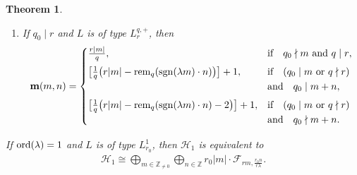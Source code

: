 \documentclass[pdftex]{sigma}
\newcommand\Z{{\mathbb Z}}
\newcommand\bm{\textbf{{\rm \textbf{m}}}}
\newcommand\cH{{\mathcal H}}
\newcommand{\sgn}{\mathop{{\rm sgn}}}
\newcommand{\rem}{\mathop{{\rm rem}}}
\newcommand{\ord}{{\rm ord}}
\numberwithin{equation}{section}
\newtheorem{Theorem}{Theorem}[section]
\begin{document}
\begin{Theorem}
\begin{enumerate}
\begin{enumerate}
\begin{gather*}
\begin{cases}
& \text{if\quad $n \equiv \overline{rm}$ {\rm mod}\ $q_0$},
\\[.5ex]
\big[\frac1q\big( r|m|-\rem_q(\sgn(\lambda m)\cdot n)-2\big)\big]+1,
& \text{if\quad $n\not\equiv \overline{rm}$ {\rm mod} $q_0$},
\end{cases}
\end{gather*}
where $\overline{rm}=\sgn(\lambda)rm$ if $3\mid q$ and $\overline{rm}=0$ otherwise.
%
\item[$(b)$]
 If $q_0\mid r$ and $L$ is of type $L_r^{q,+}$, then
\begin{gather*}
\bm(m,n) =
\begin{cases}
\frac{r|m|}{q},&\text{if\quad $q_0\nmid m$ and $q\mid r$},
\\[1ex]
\big[\frac1q\big(r|m|-\rem_q(\sgn(\lambda m)\cdot n)\big)\big]+1,
& \text{if\quad $(q_0\mid m$ or $q\nmid r)$}
\\
&\mbox{and}\quad q_0\mid m+n,
\\[1ex]
\big[\frac1q\big(r|m|-\rem_q(\sgn(\lambda m)\cdot n)-2\big)\big]+1,
&\text{if\quad $(q_0\mid m$ or $q\nmid r)$}\\ &\mbox{and}\quad q_0\nmid m+n.
\end{cases}
\end{gather*}
\end{enumerate}
If $\ord(\lambda)=1$ and $L$ is of type $L^1_{r_0}$, then $\cH_1$ is equivalent to
\begin{gather*}
\cH_1\cong\bigoplus_{m\in\Z _{\not=0}}\bigoplus_{n\in \Z} r_0|m|\cdot {\mathcal F}_{rm,\frac {r_0n}{r\lambda}}.
\end{gather*}
\end{enumerate}
\end{Theorem}
\end{document}
